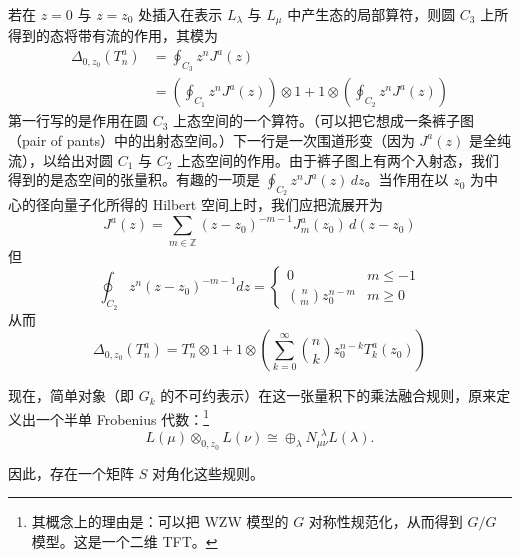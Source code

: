 若在 $z=0$ 与 $z=z_0$ 处插入在表示 $L_\lambda$ 与 $L_\mu$ 中产生态的局部算符，则圆 $C_3$ 上所得到的态将带有流的作用，其模为
\begin{equation}
  \begin{aligned}
    \Delta_{0,z_0}(T_n^a)&=\oint_{C_3}z^nJ^a(z)\\
    &=\left(\oint_{C_1}z^nJ^a(z)\right)\otimes 1+1\otimes\left(\oint_{C_2}z^nJ^a(z)\right)
  \end{aligned}
  \tag{4.219}
  \label{eq:4.219}
\end{equation}
第一行写的是作用在圆 $C_3$ 上态空间的一个算符。（可以把它想成一条裤子图（pair of pants）中的出射态空间。）下一行是一次围道形变（因为 $J^a(z)$ 是全纯流），以给出对圆 $C_1$ 与 $C_2$ 上态空间的作用。由于裤子图上有两个入射态，我们得到的是态空间的张量积。有趣的一项是 $\oint_{C_2}z^nJ^a(z)\,dz$。当作用在以 $z_0$ 为中心的径向量子化所得的 Hilbert 空间上时，我们应把流展开为
\begin{equation}
  J^a(z)=\sum_{m\in\mathbb{Z}}(z-z_0)^{-m-1}J_m^a(z_0)\,d(z-z_0)
  \tag{4.220}
  \label{eq:4.220}
\end{equation}
但
\begin{equation}
  \oint_{C_2}z^n(z-z_0)^{-m-1}dz=
  \begin{cases}
    0 & m\le-1\\
    \binom{n}{m}z_0^{n-m} & m\ge0
  \end{cases}
  \tag{4.221}
  \label{eq:4.221}
\end{equation}
从而
\begin{equation}
  \Delta_{0,z_0}(T_n^a)=T_n^a\otimes 1+1\otimes\left(\sum_{k=0}^{\infty}\binom{n}{k}z_0^{n-k}T_k^a(z_0)\right)
  \tag{4.222}
  \label{eq:4.222}
\end{equation}

现在，简单对象（即 $G_k$ 的不可约表示）在这一张量积下的乘法融合规则，原来定义出一个半单 Frobenius 代数：\footnote{其概念上的理由是：可以把 WZW 模型的 $G$ 对称性规范化，从而得到 $G/G$ 模型。这是一个二维 TFT。}
\begin{equation}
  L(\mu)\otimes_{0,z_0}L(\nu)\cong\oplus_\lambda N_{\mu\nu}^{\ \ \lambda}L(\lambda).
  \tag{4.223}
  \label{eq:4.223}
\end{equation}

因此，存在一个矩阵 $S$ 对角化这些规则。
